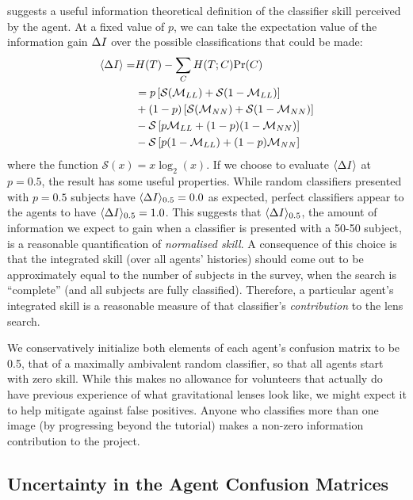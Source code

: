 \documentclass[useAMS,usenatbib,a4paper]{mn2e}
\begin{document}
 suggests a useful information theoretical 
definition of the classifier skill  perceived by the agent. At a fixed
value of $p$, we can take the expectation value of the information gain
$\Delta I$ over  the possible classifications that could be made:
\begin{align}
\langle\Delta I\rangle   =& H(T) - \sum_C H(T;C) {\rm Pr}(C) \notag \\ 
         &   =     p  \left[ \mathcal{S}(\mathcal{M}_{LL}) + \mathcal{S}(1-\mathcal{M}_{LL}) \right] \notag \\
         &     +(1-p) \left[ \mathcal{S}(\mathcal{M}_{NN}) + \mathcal{S}(1-\mathcal{M}_{NN}) \right] \notag \\
         & - \mathcal{S}\left[ p    \mathcal{M}_{LL}       + (1-p)(1-\mathcal{M}_{NN})     \right] \notag \\
         & - \mathcal{S}\left[ p (1-\mathcal{M}_{LL})      + (1-p)   \mathcal{M}_{NN}      \right] 
\end{align}
where the function $\mathcal{S}(x) = x \log_2(x)$. If we choose to
evaluate $\langle\Delta I\rangle$ at $p = 0.5$, the result has some
useful properties. While random classifiers presented with  $p = 0.5$
subjects have ${\langle \Delta I \rangle_{0.5}} = 0.0$  as expected, perfect classifiers appear to
the agents to have  ${\langle \Delta I \rangle_{0.5}} = 1.0$. This suggests that  ${\langle \Delta I \rangle_{0.5}}$, the
amount of information we expect to  gain when a classifier is presented
with a 50-50 subject, is a reasonable quantification of 
\emph{normalised skill}. A consequence of this choice is that the
integrated skill (over all agents' histories) should come out to be
approximately 
equal to the number of subjects in the survey, when the search is
``complete'' (and all subjects are fully classified). Therefore, a
particular agent's integrated skill is a reasonable 
measure of that classifier's
\emph{contribution} to the lens search.

We conservatively initialize both elements of each  agent's confusion
matrix to be 0.5, that of a maximally ambivalent  random classifier, so
that all agents start with zero skill. While  this makes no allowance
for volunteers that actually do have previous experience of what
gravitational lenses look like, we might expect it to help mitigate
against false positives. Anyone who classifies more than one image (by
progressing beyond the tutorial) makes a non-zero information
contribution to the project.


\subsection{Uncertainty in the Agent Confusion Matrices}
\label{appendix:swap:uncertainty}
\end{document}
